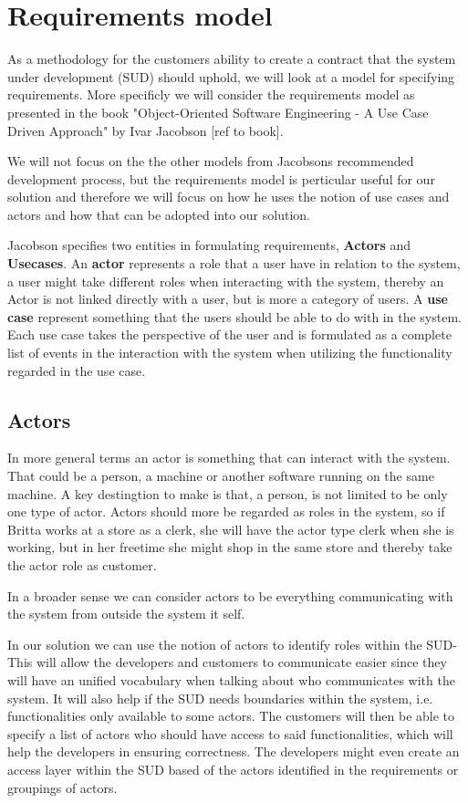 \section{Requirements model}

As a methodology for the customers ability to create a contract that the system under development (SUD) should uphold, we will look at a model for specifying requirements.
More specificly we will consider the requirements model as presented in the book "Object-Oriented Software Engineering - A Use Case Driven Approach" by Ivar Jacobson [ref to book].

We will not focus on the the other models from Jacobsons recommended development process, but the requirements model is perticular useful for our solution and therefore we will focus on how he uses the notion of use cases and actors and how that can be adopted into our solution.

Jacobson specifies two entities in formulating requirements, \textbf{Actors} and \textbf{Usecases}.
An \textbf{actor} represents a role that a user have in relation to the system, a user might take different roles when interacting with the system, thereby an Actor is not linked directly with a user, but is more a category of users.
A \textbf{use case} represent something that the users should be able to do with in the system. Each use case takes the perspective of the user and is formulated as a complete list of events in the interaction with the system when utilizing the functionality regarded in the use case.

\subsection{Actors}
In more general terms an actor is something that can interact with the system. That could be a person, a machine or another software running on the same machine. 
A key destingtion to make is that, a person, is not limited to be only one type of actor.
Actors should more be regarded as roles in the system, so if Britta works at a store as a clerk, she will have the actor type clerk when she is working, but in her freetime she might shop in the same store and thereby take the actor role as customer. 

In a broader sense we can consider actors to be everything communicating with the system from outside the system it self.

In our solution we can use the notion of actors to identify roles within the SUD- 
This will allow the developers and customers to communicate easier since they will have an unified vocabulary when talking about who communicates with the system. 
It will also help if the SUD needs boundaries within the system, i.e. functionalities only available to some actors.
The customers will then be able to specify a list of actors who should have access to said functionalities, which will help the developers in ensuring correctness.
The developers might even create an access layer within the SUD based of the actors identified in the requirements or groupings of actors.


